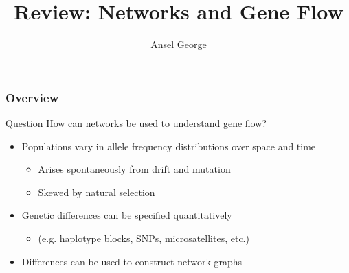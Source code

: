 \documentclass{beamer}
\title{Review: Networks and Gene Flow}
\author{Ansel George}
\begin{document}
\begin{frame}
\titlepage%
\end{frame}

\begin{frame}
  \frametitle{Overview}
  \begin{block}{Question}
    How can networks be used to understand gene flow?
  \end{block}
  \begin{itemize}
    \item Populations vary in allele frequency distributions over space and time
    \begin{itemize}
      \item Arises spontaneously from drift and mutation
      \item Skewed by natural selection
    \end{itemize}
    \item Genetic differences can be specified quantitatively
      \begin{itemize}
        \item (e.g. haplotype blocks, SNPs, microsatellites, etc.)
      \end{itemize}
    \item Differences can be used to construct network graphs
  \end{itemize}
\end{frame}
\end{document}
